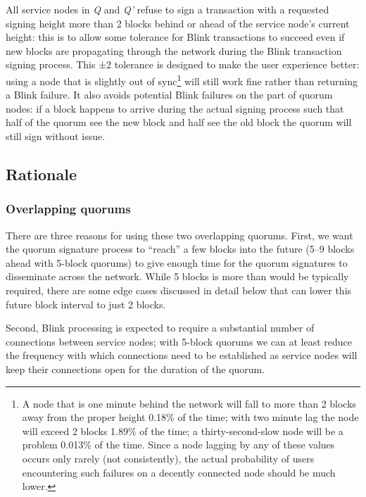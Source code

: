 All service nodes in \emph{Q} and \emph{Q'} refuse to sign a transaction
with a requested signing height more than 2 blocks behind or ahead of
the service node's current height: this is to allow some tolerance for
Blink transactions to succeed even if new blocks are propagating through
the network during the Blink transaction signing process. This ±2
tolerance is designed to make the user experience better: using a node
that is slightly out of sync\footnote{A node that is one minute behind
  the network will fall to more than 2 blocks away from the proper
  height 0.18\% of the time; with two minute lag the node will exceed 2
  blocks 1.89\% of the time; a thirty-second-slow node will be a problem
  0.013\% of the time. Since a node lagging by any of these values
  occurs only rarely (not consistently), the actual probability of users
  encountering such failures on a decently connected node should be much
  lower.} will still work fine rather than returning a Blink failure. It
also avoids potential Blink failures on the part of quorum nodes: if a
block happens to arrive during the actual signing process such that half
of the quorum see the new block and half see the old block the quorum
will still sign without issue.

\hypertarget{rationale}{%
\subsection{Rationale}\label{rationale}}

\hypertarget{overlapping-quorums}{%
\subsubsection{Overlapping quorums}\label{overlapping-quorums}}

There are three reasons for using these two overlapping quorums. First,
we want the quorum signature process to ``reach'' a few blocks into the
future (5--9 blocks ahead with 5-block quorums) to give enough time for
the quorum signatures to disseminate across the network. While 5 blocks
is more than would be typically required, there are some edge cases
discussed in detail below that can lower this future block interval to
just 2 blocks.

Second, Blink processing is expected to require a substantial number of
connections between service nodes; with 5-block quorums we can at least
reduce the frequency with which connections need to be established as
service nodes will keep their connections open for the duration of the
quorum.

